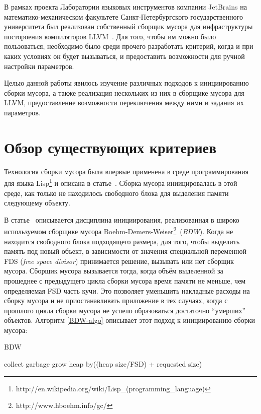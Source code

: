 В рамках проекта Лаборатории языковых инструментов компании JetBrains на математико-механическом 
факультете
Санкт-Петербургского государственного университета был реализован собственный сборщик
мусора для
инфраструктуры постороения компиляторов LLVM~\cite{llvm-text}. Для того, чтобы им можно
было пользоваться,
необходимо было среди прочего разработать критерий, когда и при каких условиях он будет 
вызываться, и предоставить возможности для ручной настройки параметров.

Целью данной работы явилось изучение различных подходов к инициированию сборки мусора,
а также реализация нескольких из них в сборщике мусора для LLVM, предоставление 
возможности переключения между ними и задания их параметров.

\section {Обзор существующих критериев}

Технология сборки мусора была впервые применена в среде программирования для языка
Lisp\footnote{http://en.wikipedia.org/wiki/Lisp\_(programming\_language)} и описана 
в статье~\cite{Lisp}. Сборка мусора иниицировалась в этой среде, как только не находилось
свободного блока для выделения памяти следующему объекту. 



В статье~\cite{BDW} описывается дисциплина инициирования, реализованная в
широко используемом сборщике мусора
Boehm-Demers-Weiser\footnote{http://www.hboehm.info/gc/}~(\emph{BDW}). 
Когда не находится свободного блока подходящего размера, для того, чтобы выделить память 
под новый объект,
в зависимости от значения специальной переменной FDS (\emph{free space divisor}) 
принимается решение,
вызывать или нет сборщик мусора. Сборщик мусора вызывается тогда, когда объём выделенной за прошеднее с предыдущего цикла сборки мусора
время памяти не меньше, чем определяемая FSD часть кучи. Это позволяет  уменьшить накладные расходы на сборку мусора и не приостанавливать
приложение в тех случаях, когда с прошлого цикла сборки мусора не успело образоваться
достаточно ``умерших'' объектов. Алгоритм \ref{BDW-algo} описывает этот подход к инициированию сборки мусора: 

\begin{algorithm}[hbt]
\caption{BDW}
\label{BDW-algo}
\begin{algorithmic}[1]
        \State collect garbage
    \Else 
        \State grow heap by((heap size/FSD) + requested size)
    \EndIf
\EndIf
\end{algorithmic}
\end{algorithm}

